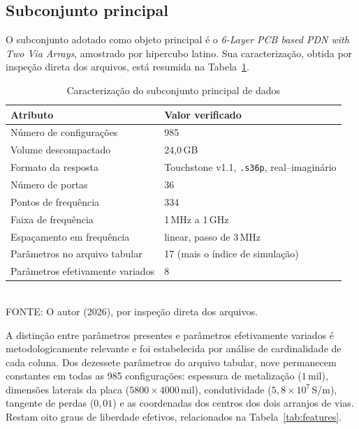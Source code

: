 \subsection{Subconjunto principal}

O subconjunto adotado como objeto principal é o \textit{6-Layer PCB based PDN
with Two Via Arrays}, amostrado por hipercubo latino. Sua caracterização, obtida
por inspeção direta dos arquivos, está resumida na
Tabela~\ref{tab:dataset}.

\begin{table}[htb]
\centering
\caption{Caracterização do subconjunto principal de dados}
\label{tab:dataset}
\footnotesize
\begin{tabular}{@{}ll@{}}
\toprule
\textbf{Atributo} & \textbf{Valor verificado} \\
\midrule
Número de configurações & 985 \\
Volume descompactado & 24{,}0\,GB \\
Formato da resposta & Touchstone v1.1, \texttt{.s36p}, real--imaginário \\
Número de portas & 36 \\
Pontos de frequência & 334 \\
Faixa de frequência & 1\,MHz a 1\,GHz \\
Espaçamento em frequência & linear, passo de 3\,MHz \\
Parâmetros no arquivo tabular & 17 (mais o índice de simulação) \\
Parâmetros efetivamente variados & 8 \\
\bottomrule
\end{tabular}
\vspace{0.3em}
\\{\footnotesize FONTE: O autor (2026), por inspeção direta dos arquivos.}
\end{table}

A distinção entre parâmetros presentes e parâmetros efetivamente variados é
metodologicamente relevante e foi estabelecida por análise de cardinalidade de
cada coluna. Dos dezessete parâmetros do arquivo tabular, nove permanecem
constantes em todas as 985 configurações: espessura de metalização
($1$\,mil), dimensões laterais da placa ($5800 \times 4000$\,mil), condutividade
($5{,}8\times 10^7$\,S/m), tangente de perdas ($0{,}01$) e as coordenadas dos
centros dos dois arranjos de vias. Restam oito graus de liberdade efetivos,
relacionados na Tabela~\ref{tab:features}.

